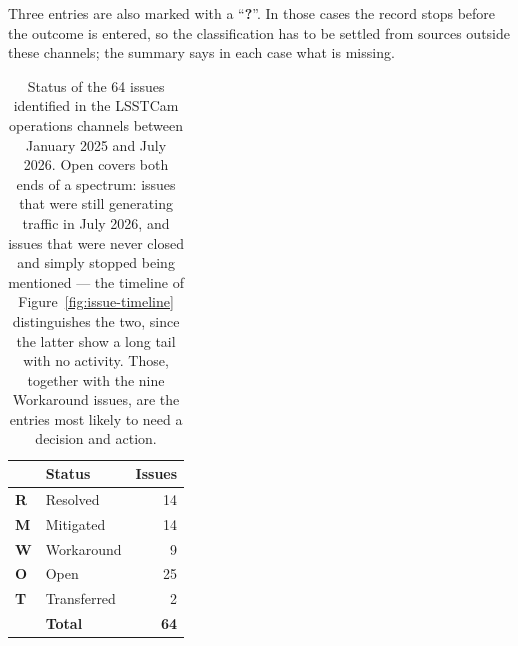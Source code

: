 \noindent
Three entries are also marked with a ``\textbf{?}''.  In those cases the record stops before
the outcome is entered, so the classification has to be settled from sources outside
these channels; the summary says in each case what is missing.

\begin{table}[htb]
\centering
\begin{tabular}{llr}
\toprule
 & Status & Issues \\
\midrule
\textcolor{stres}{\textbf{R}} & Resolved & 14 \\
\textcolor{stmit}{\textbf{M}} & Mitigated & 14 \\
\textcolor{stwrk}{\textbf{W}} & Workaround & 9 \\
\textcolor{stopn}{\textbf{O}} & Open & 25 \\
\textcolor{sttra}{\textbf{T}} & Transferred & 2 \\
\midrule
 & \textbf{Total} & \textbf{64} \\
\bottomrule
\end{tabular}
\caption{Status of the 64 issues identified in the LSSTCam operations
channels between January 2025 and July 2026.  Open covers both ends of a spectrum: issues that were still
generating traffic in July 2026, and issues that were never closed and simply
stopped being mentioned --- the timeline of
Figure~\ref{fig:issue-timeline} distinguishes the two, since the latter show a
long tail with no activity.  Those, together with the nine Workaround issues, are the
entries most likely to need a decision and action.}
\label{tab:issue-status}
\end{table}
